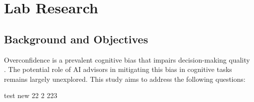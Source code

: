 \documentclass[12pt,a4paper, man]{article}
\begin{document}
\begingroup
{} 
\onehalfspacing 
\tableofcontents
\clearpage
\endgroup


\begingroup
\setlength{\parskip}{0.2\baselineskip}
\section{Lab Research}
\subsection{Background and Objectives}

Overconfidence is a prevalent cognitive bias that impairs decision-making quality \parencite{achtzigerFastRationalResponseTimes2014}. The potential role of AI advisors in mitigating this bias in cognitive tasks remains largely unexplored. This study aims to address the following questions:


test new
22
2 223
\endgroup

\printbibliography 
\end{document}
